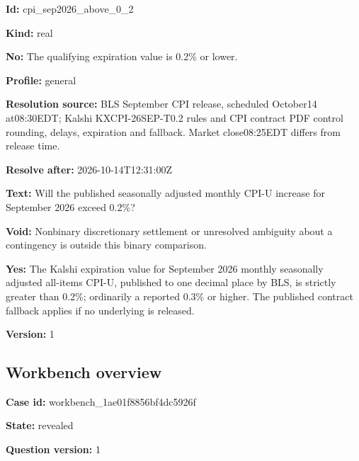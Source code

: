 \documentclass[11pt]{article}
\begin{document}
\par\noindent\textbf{Id:} cpi\_sep2026\_above\_0\_2

\par\noindent\textbf{Kind:} real

\par\noindent\textbf{No:} The qualifying expiration value is 0.2\% or lower.

\par\noindent\textbf{Profile:} general

\par\noindent\textbf{Resolution source:} BLS September CPI release, scheduled October14 at08:30EDT; Kalshi KXCPI-26SEP-T0.2 rules and CPI contract PDF control rounding, delays, expiration and fallback. Market close08:25EDT differs from release time.

\par\noindent\textbf{Resolve after:} 2026-10-14T12:31:00Z

\par\noindent\textbf{Text:} Will the published seasonally adjusted monthly CPI-U increase for September 2026 exceed 0.2\%?

\par\noindent\textbf{Void:} Nonbinary discretionary settlement or unresolved ambiguity about a contingency is outside this binary comparison.

\par\noindent\textbf{Yes:} The Kalshi expiration value for September 2026 monthly seasonally adjusted all-items CPI-U, published to one decimal place by BLS, is strictly greater than 0.2\%; ordinarily a reported 0.3\% or higher. The published contract fallback applies if no underlying is released.

\par\noindent\textbf{Version:} 1

\subsection*{\textcolor{epdarkgreen}{Workbench overview}}
\par\noindent\textbf{Case id:} workbench\_1a\hspace{0pt}e01f8856bf4d\hspace{0pt}c5926f

\par\noindent\textbf{State:} revealed

\par\noindent\textbf{Question version:} 1
\end{document}
